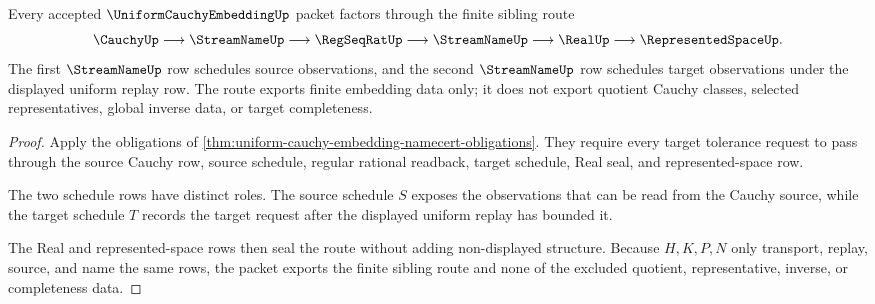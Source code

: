 \begin{theorem}
\label{thm:uniform-cauchy-embedding-sibling-route}
Every accepted $\UniformCauchyEmbeddingUp$ packet factors through the finite sibling route
$$
\CauchyUp \longrightarrow \StreamNameUp \longrightarrow \RegSeqRatUp \longrightarrow \StreamNameUp \longrightarrow \RealUp \longrightarrow \RepresentedSpaceUp .
$$
The first $\StreamNameUp$ row schedules source observations, and the second $\StreamNameUp$ row schedules target observations under the displayed uniform replay row. The route exports finite embedding data only; it does not export quotient Cauchy classes, selected representatives, global inverse data, or target completeness.
\end{theorem}
\begin{proof}
Apply the obligations of \autoref{thm:uniform-cauchy-embedding-namecert-obligations}. They require every target tolerance request to pass through the source Cauchy row, source schedule, regular rational readback, target schedule, Real seal, and represented-space row.

The two schedule rows have distinct roles. The source schedule $S$ exposes the observations that can be read from the Cauchy source, while the target schedule $T$ records the target request after the displayed uniform replay has bounded it.

The Real and represented-space rows then seal the route without adding non-displayed structure. Because $H,K,P,N$ only transport, replay, source, and name the same rows, the packet exports the finite sibling route and none of the excluded quotient, representative, inverse, or completeness data.
\end{proof}


